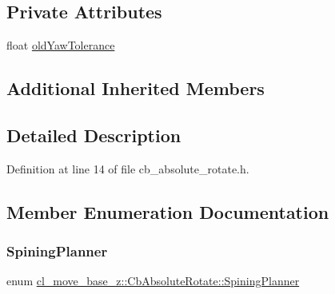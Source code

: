 \subsection*{Private Attributes}
\begin{DoxyCompactItemize}
\item 
float \hyperlink{classcl__move__base__z_1_1CbAbsoluteRotate_a2cfcd2978e7923494e2e66107e134e27}{old\+Yaw\+Tolerance}
\end{DoxyCompactItemize}
\subsection*{Additional Inherited Members}


\subsection{Detailed Description}


Definition at line 14 of file cb\+\_\+absolute\+\_\+rotate.\+h.



\subsection{Member Enumeration Documentation}
\mbox{\label{classcl__move__base__z_1_1CbAbsoluteRotate_ab8d45e43594a3fc6a71c08f07b5dbef0}} 
\subsubsection{\texorpdfstring{Spining\+Planner}{SpiningPlanner}}
{\footnotesize\ttfamily enum \hyperlink{classcl__move__base__z_1_1CbAbsoluteRotate_ab8d45e43594a3fc6a71c08f07b5dbef0}{cl\+\_\+move\+\_\+base\+\_\+z\+::\+Cb\+Absolute\+Rotate\+::\+Spining\+Planner}\hspace{0.3cm}{\ttfamily [strong]}}

